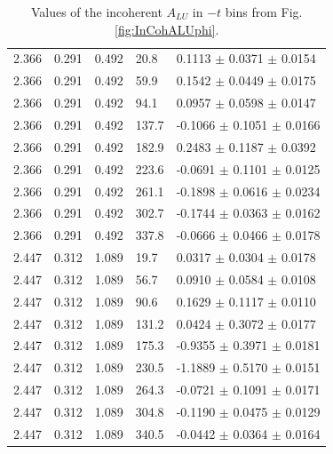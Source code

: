 \documentclass{article}
\begin{document}
\begin{table}[!h]
\begin{center}
\begin{tabular}{||l|l|l|l|l||}
  2.366 & 0.291 & 0.492  &   20.8  &  0.1113  $\pm$ 0.0371  $\pm$ 0.0154 \\
  2.366 & 0.291 & 0.492  &   59.9  &  0.1542  $\pm$ 0.0449  $\pm$ 0.0175 \\
  2.366 & 0.291 & 0.492  &   94.1  &  0.0957  $\pm$ 0.0598  $\pm$ 0.0147 \\
  2.366 & 0.291 & 0.492  &  137.7  & -0.1066  $\pm$ 0.1051  $\pm$ 0.0166 \\
  2.366 & 0.291 & 0.492  &  182.9  &  0.2483  $\pm$ 0.1187  $\pm$ 0.0392 \\
  2.366 & 0.291 & 0.492  &  223.6  & -0.0691  $\pm$ 0.1101  $\pm$ 0.0125 \\
  2.366 & 0.291 & 0.492  &  261.1  & -0.1898  $\pm$ 0.0616  $\pm$ 0.0234 \\
  2.366 & 0.291 & 0.492  &  302.7  & -0.1744  $\pm$ 0.0363  $\pm$ 0.0162 \\
  2.366 & 0.291 & 0.492  &  337.8  & -0.0666  $\pm$ 0.0466  $\pm$ 0.0178 \\
  \hline                                                              
                                                                           
  2.447 & 0.312 & 1.089  &  19.7   & 0.0317   $\pm$ 0.0304  $\pm$ 0.0178 \\
  2.447 & 0.312 & 1.089  &  56.7   & 0.0910   $\pm$ 0.0584  $\pm$ 0.0108 \\
  2.447 & 0.312 & 1.089  &  90.6   & 0.1629   $\pm$ 0.1117  $\pm$ 0.0110 \\
  2.447 & 0.312 & 1.089  & 131.2   & 0.0424   $\pm$ 0.3072  $\pm$ 0.0177 \\
  2.447 & 0.312 & 1.089  & 175.3   &-0.9355   $\pm$ 0.3971  $\pm$ 0.0181 \\
  2.447 & 0.312 & 1.089  & 230.5   &-1.1889   $\pm$ 0.5170  $\pm$ 0.0151 \\
  2.447 & 0.312 & 1.089  & 264.3   &-0.0721   $\pm$ 0.1091  $\pm$ 0.0171 \\
  2.447 & 0.312 & 1.089  & 304.8   &-0.1190   $\pm$ 0.0475  $\pm$ 0.0129 \\
  2.447 & 0.312 & 1.089  & 340.5   &-0.0442   $\pm$ 0.0364  $\pm$ 0.0164 \\

 \hline
 \hline
 \end{tabular}
 \caption{Values of the incoherent $A_{LU}$ in $-t$ bins from Fig. \ref{fig:InCohALUphi}.}
 \label{table:InCoh_t_BSA}
 \end{center}
\end{table}
\end{document}
